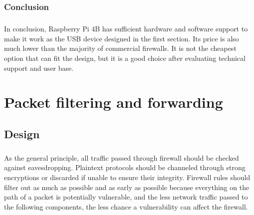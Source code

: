 \documentclass[mscthesis]{usiinfthesis}
\begin{document}
\subsection{Conclusion}
\paragraph{}
In conclusion, Raspberry Pi 4B has sufficient hardware and software support to make it work as the USB device designed in the first section. Its price is also much lower than the majority of commercial firewalls. It is not the cheapest option that can fit the design, but it is a good choice after evaluating technical support and user base.

\chapter{Packet filtering and forwarding}
\section{Design}
\paragraph{}
As the general principle, all traffic passed through firewall should be checked against eavesdropping. Plaintext protocols should be channeled through strong encryptions or discarded if unable to ensure their integrity. Firewall rules should filter out as much as possible and as early as possible because everything on the path of a packet is potentially vulnerable, and the less network traffic passed to the following components, the less chance a vulnerability can affect the firewall.
\end{document}
